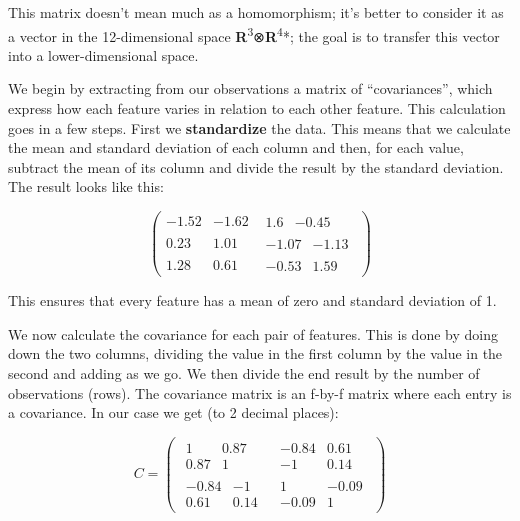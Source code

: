 \documentclass[oneside,english]{amsbook}
\numberwithin{section}{chapter}
\theoremstyle{plain}
\theoremstyle{definition}
\begin{document}
This matrix doesn't mean much as a homomorphism; it's better to consider
it as a vector in the 12-dimensional space
\textbf{R}\textsuperscript{3}⊗\textbf{R}\textsuperscript{4}*; the goal
is to transfer this vector into a lower-dimensional space.

We begin by extracting from our observations a matrix of
``covariances'', which express how each feature varies in relation to
each other feature. This calculation goes in a few steps. First we
\textbf{standardize} the data. This means that we calculate the mean and
standard deviation of each column and then, for each value, subtract the
mean of its column and divide the result by the standard deviation. The
result looks like this:

\[\begin{pmatrix}
	- 1.52 & - 1.62 & \begin{matrix}
		1.6 & - 0.45
	\end{matrix} \\
	0.23 & 1.01 & \begin{matrix}
		- 1.07 & - 1.13
	\end{matrix} \\
	1.28 & 0.61 & \begin{matrix}
		- 0.53 & 1.59
	\end{matrix}
\end{pmatrix}\]

This ensures that every feature has a mean of zero and standard
deviation of 1.

We now calculate the covariance for each pair of features. This is done
by doing down the two columns, dividing the value in the first column by
the value in the second and adding as we go. We then divide the end
result by the number of observations (rows). The covariance matrix is an
f-by-f matrix where each entry is a covariance. In our case we get (to 2
decimal places):

\[C = \begin{pmatrix}
	\begin{matrix}
		1 & 0.87 \\
		0.87 & 1
	\end{matrix} & \begin{matrix}
		- 0.84 & 0.61 \\
		- 1 & 0.14
	\end{matrix} \\
	\begin{matrix}
		- 0.84 & - 1 \\
		0.61 & 0.14
	\end{matrix} & \begin{matrix}
		1 & - 0.09 \\
		- 0.09 & 1
	\end{matrix}
\end{pmatrix}\]
\end{document}

